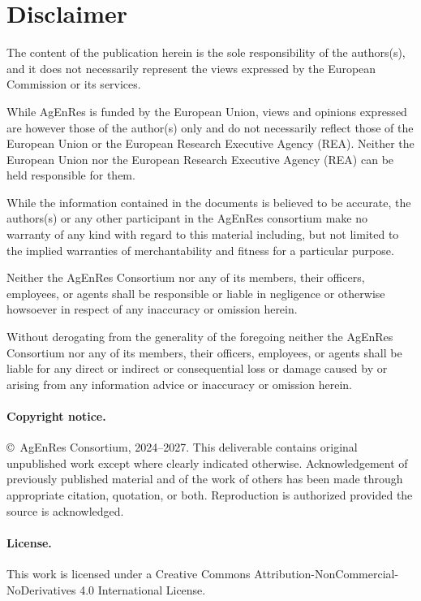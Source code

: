 \documentclass[12pt,a4paper]{article}
\begin{document}
\section*{Disclaimer}

The content of the publication herein is the sole responsibility of the authors(s), and it does not necessarily represent the views expressed by the European Commission or its services.

While AgEnRes is funded by the European Union, views and opinions expressed are however those of the author(s) only and do not necessarily reflect those of the European Union or the European Research Executive Agency (REA). Neither the European Union nor the European Research Executive Agency (REA) can be held responsible for them.

While the information contained in the documents is believed to be accurate, the authors(s) or any other participant in the AgEnRes consortium make no warranty of any kind with regard to this material including, but not limited to the implied warranties of merchantability and fitness for a particular purpose.

Neither the AgEnRes Consortium nor any of its members, their officers, employees, or agents shall be responsible or liable in negligence or otherwise howsoever in respect of any inaccuracy or omission herein.

Without derogating from the generality of the foregoing neither the AgEnRes Consortium nor any of its members, their officers, employees, or agents shall be liable for any direct or indirect or consequential loss or damage caused by or arising from any information advice or inaccuracy or omission herein.

\paragraph{Copyright notice.}
\copyright~AgEnRes Consortium, 2024--2027. This deliverable contains original unpublished work except where clearly indicated otherwise. Acknowledgement of previously published material and of the work of others has been made through appropriate citation, quotation, or both. Reproduction is authorized provided the source is acknowledged.

\paragraph{License.} This work is licensed under a Creative Commons Attribution-NonCommercial-NoDerivatives 4.0 International License.
\end{document}
